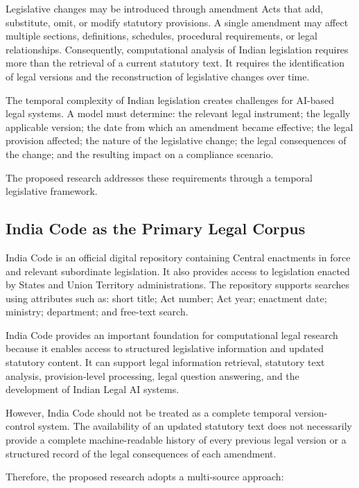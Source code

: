 Legislative changes may be introduced through amendment Acts that add, substitute, omit, or modify statutory provisions. A single amendment may affect multiple sections, definitions, schedules, procedural requirements, or legal relationships. Consequently, computational analysis of Indian legislation requires more than the retrieval of a current statutory text. It requires the identification of legal versions and the reconstruction of legislative changes over time.

The temporal complexity of Indian legislation creates challenges for AI-based legal systems. A model must determine: the relevant legal instrument; the legally applicable version; the date from which an amendment became effective; the legal provision affected; the nature of the legislative change; the legal consequences of the change; and the resulting impact on a compliance scenario.

The proposed research addresses these requirements through a temporal legislative framework.

\subsection{India Code as the Primary Legal Corpus}

\label{sec:2-2-2}

India Code \cite{indiacode} is an official digital repository containing Central enactments in force and relevant subordinate legislation. It also provides access to legislation enacted by States and Union Territory administrations. The repository supports searches using attributes such as: short title; Act number; Act year; enactment date; ministry; department; and free-text search.

India Code provides an important foundation for computational legal research because it enables access to structured legislative information and updated statutory content. It can support legal information retrieval, statutory text analysis, provision-level processing, legal question answering, and the development of Indian Legal AI systems.

However, India Code should not be treated as a complete temporal version-control system. The availability of an updated statutory text does not necessarily provide a complete machine-readable history of every previous legal version or a structured record of the legal consequences of each amendment.

Therefore, the proposed research adopts a multi-source approach:

